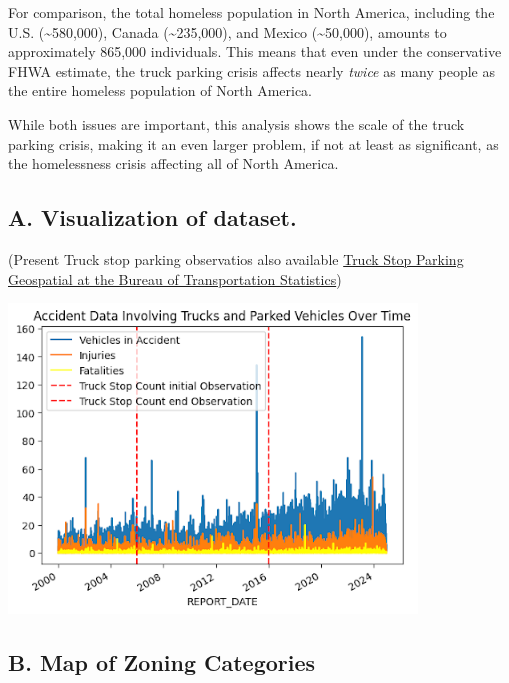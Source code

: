 \documentclass[
  12pt]{article}
\begin{document}
For comparison, the total homeless population in North America,
including the U.S. (\textasciitilde580,000), Canada
(\textasciitilde235,000), and Mexico (\textasciitilde50,000), amounts to
approximately 865,000 individuals. This means that even under the
conservative FHWA estimate, the truck parking crisis affects nearly
\emph{twice} as many people as the entire homeless population of North
America.

While both issues are important, this analysis shows the scale of the
truck parking crisis, making it an even larger problem, if not at least
as significant, as the homelessness crisis affecting all of North
America.

\subsection{\texorpdfstring{\textbf{A. Visualization of
dataset.}}{A. Visualization of dataset.}}\label{sec-a.-visualization-of-dataset.-}

(Present Truck stop parking observatios also available
\href{https://data-usdot.opendata.arcgis.com/datasets/usdot::truck-stop-parking/about}{Truck
Stop Parking \textbar{} Geospatial at the Bureau of Transportation
Statistics})

\includegraphics[width=4.27083in,height=\textheight]{images/unnamed.png}

\subsection{B. Map of Zoning
Categories}\label{sec-b.-map-of-zoning-categories}
\end{document}
